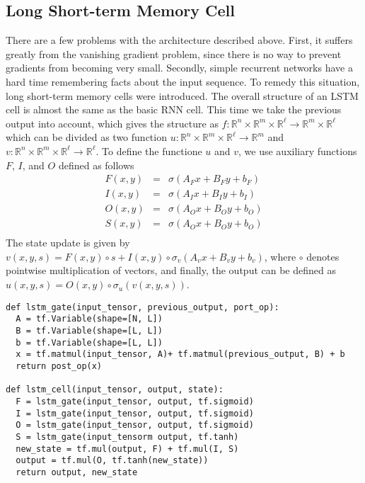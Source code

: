 \documentclass[10pt]{amsart}
\newcommand{\R}{\mathbb{R}}
\theoremstyle{definition}
\begin{document}
\subsection{Long Short-term Memory Cell} There are a few problems with the architecture described above.  First, it suffers greatly from the vanishing gradient problem, since there is no way to prevent gradients from becoming very small.  Secondly, simple recurrent networks have a hard time remembering facts about the input sequence.  To remedy this situation, long short-term memory cells were introduced.  The overall structure of an LSTM cell is almost the same as the basic RNN cell. This time we take the previous output into account, which gives the structure as $f:\R^n\times \R^m\times \R^{\ell}\to \R^m\times \R^{\ell}$ which can be divided as two function $u:\R^{n}\times\R^m\times \R^{\ell}\to \R^m$ and $v:\R^n\times \R^m\times\R^{\ell}\to \R^{\ell}$. To define the functione $u$ and $v$, we use auxiliary functions $F$, $I$, and $O$ defined as follows
\begin{eqnarray*}
  F(x, y) &=& \sigma(A_Fx + B_Fy + b_F)\\
  I(x, y) &=& \sigma(A_Ix + B_Iy + b_I)\\
  O(x, y) &=& \sigma(A_Ox + B_Oy + b_O)\\
  S(x, y) &=& \sigma(A_Ox + B_Oy + b_O)\\
\end{eqnarray*}
The state update is given by $v(x, y, s) = F(x, y)\circ s + I(x, y)\circ \sigma_v(A_vx + B_vy + b_v)$, where $\circ$ denotes pointwise multiplication of vectors, and finally, the output can be defined as $u(x, y, s)=O(x, y)\circ \sigma_u(v(x, y, s))$.

\begin{verbatim}
def lstm_gate(input_tensor, previous_output, port_op):
  A = tf.Variable(shape=[N, L])
  B = tf.Variable(shape=[L, L])
  b = tf.Variable(shape=[L, L])
  x = tf.matmul(input_tensor, A)+ tf.matmul(previous_output, B) + b
  return post_op(x)

def lstm_cell(input_tensor, output, state):
  F = lstm_gate(input_tensor, output, tf.sigmoid)
  I = lstm_gate(input_tensor, output, tf.sigmoid)
  O = lstm_gate(input_tensor, output, tf.sigmoid)
  S = lstm_gate(input_tensorm output, tf.tanh)
  new_state = tf.mul(output, F) + tf.mul(I, S)
  output = tf.mul(O, tf.tanh(new_state))
  return output, new_state
\end{verbatim}



\end{document}
